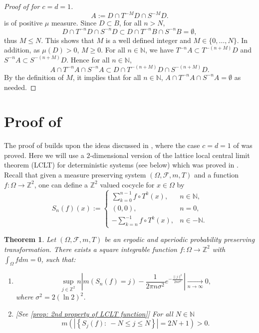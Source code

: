 \documentclass[12pt,reqno]{amsart}
\newcommand{\N}{\mathbb{N}}
\newcommand{\Z}{\mathbb{Z}}
\newtheorem{thm}{Theorem}[section]
\theoremstyle{definition}
\begin{document}
\begin{proof}[Proof of  for $c=d=1$]
\[
A := D \cap T^{-M}D \cap S^{-M}D.
\]
is of positive $\mu$ measure. Since $D\subset B$, for all $n>N$,
\[
D \cap T^{-n}D \cap S^{-n}D\subset D \cap T^{-n}B \cap S^{-n}B=\emptyset,
\]
thus $M\leq N$. This shows that $M$ is a well defined integer and $M \in \{0,\ldots,N\}$.
In addition, as $\mu(D)>0$, $M\geq 0$.  For all $n \in \N$, we have $T^{-n} A \subset T^{-(n+M)}D$ and $S^{-n} A \subset S^{-(n+M)}D$. Hence for all $n\in\N$,
\[
A \cap T^{-n} A \cap S^{-n} A \subset D \cap T^{-(n+M)}D \cap S^{-(n+M)}D. 
\] 
By the definition of $M$, it implies that for all $n\in \N$, $A \cap T^{-n} A \cap S^{-n} A = \emptyset$ as needed. 
\end{proof}
\section{Proof of }\label{sec:Proof_rec_1} The proof of  builds upon the ideas discussed in , where the case $c=d=1$ of  was proved. Here we will use a $2$-dimensional version of the lattice local central limit theorem (LCLT) for deterministic systems (see  below) which was proved in \cite{kosloff_Sanadhya_2024}. Recall that given a measure preserving system $(\Omega,\mathcal{F},m,T)$ and a function $f:\Omega\to\Z^2$, one can define a $\Z^2$ valued cocycle for $x \in \Omega$ by
\[
S_n(f)(x):=\begin{cases}
\sum_{k=0}^{n-1}f\circ T^k(x), & n\in\N,\\
(0,0),& n=0,\\
-\sum_{k=n}^{-1}f\circ T^k(x), &n\in -\N.
\end{cases}
\]
\begin{thm}\label{thm:LCLT_2}
Let $(\Omega,\mathcal{F},m,T)$ be an ergodic and aperiodic probability preserving transformation. There exists a square integrable function $f:\Omega\to\mathbb{Z}^2$ with $\int_{\Omega} fdm = 0$, such that:
\begin{enumerate}[label=(\alph*)]
    \item \cite[Theorem 1.1]{kosloff_Sanadhya_2024}\label{thm_sec_a:LCLT_2}
\[
\sup_{j\in\Z^2} n\left|m\left(S_n(f)=j\right)-\frac{1}{2\pi n\sigma^2}e^{-\frac{\|j\|^2}{2n\sigma^2}}\right|\xrightarrow[n\to\infty]{}0,
\]
where $\sigma^2=2 (\ln 2)^2$.
\vspace{0.2cm}
\item \label{thm_sec_b:LCLT_2}[See \cref{prop: 2nd property of LCLT function}] For all $N\in\N$ $$m\left(\left|\left\{S_j(f):\ -N\leq j\leq N\right\}\right|=2N+1\right)>0.$$ 
\end{enumerate}

\end{thm}
\end{document}
